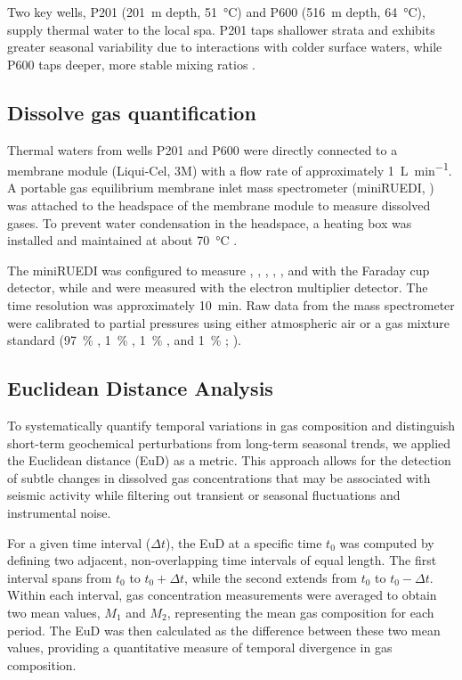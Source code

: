 Two key wells, P201 (\SI{201}{\meter} depth, \SI{51}{\celsius}) and P600 (\SI{516}{\meter} depth, \SI{64}{\celsius}), supply thermal water to the local spa.
P201 taps shallower strata and exhibits greater seasonal variability due to interactions with colder surface waters, while P600 taps deeper, more stable mixing ratios \citep{sonney2009numerical, giroud2025microbio}.

\subsection{Dissolve gas quantification}
Thermal waters from wells P201 and P600 were directly connected to a membrane module (Liqui-Cel\textsuperscript{\texttrademark}, 3M\textsuperscript{\texttrademark}) with a flow rate of approximately \SI{1}{\liter\per\minute}.
A portable gas equilibrium membrane inlet mass spectrometer (miniRUEDI, \cite{brennwald2016portable}) was attached to the headspace of the membrane module to measure dissolved gases.
To prevent water condensation in the headspace, a heating box was installed and maintained at about \SI{70}{\celsius} \citep{giroud2023new}.

The miniRUEDI was configured to measure , , , , , and  with the Faraday cup detector, while  and  were measured with the electron multiplier detector.
The time resolution was approximately \SI{10}{\minute}.
Raw data from the mass spectrometer were calibrated to partial pressures using either atmospheric air \citep{porcelli2002overview} or a gas mixture standard (\SI{97}{\percent} , \SI{1}{\percent} , \SI{1}{\percent} , and \SI{1}{\percent} ; \cite{tomonaga2019montterri}).


\subsection{Euclidean Distance Analysis}\label{methods:EuD}
To systematically quantify temporal variations in gas composition and distinguish short-term geochemical perturbations from long-term seasonal trends, we applied the Euclidean distance (EuD) as a metric.
This approach allows for the detection of subtle changes in dissolved gas concentrations that may be associated with seismic activity while filtering out transient or seasonal fluctuations and instrumental noise.  

For a given time interval (\(\Delta t\)), the EuD at a specific time \(t_0\) was computed by defining two adjacent, non-overlapping time intervals of equal length.
The first interval spans from \(t_0\) to \(t_0 + \Delta t\), while the second extends from \(t_0\) to \(t_0 - \Delta t\).
Within each interval, gas concentration measurements were averaged to obtain two mean values, \(M_1\) and \(M_2\), representing the mean gas composition for each period.
The EuD was then calculated as the difference between these two mean values, providing a quantitative measure of temporal divergence in gas composition.


